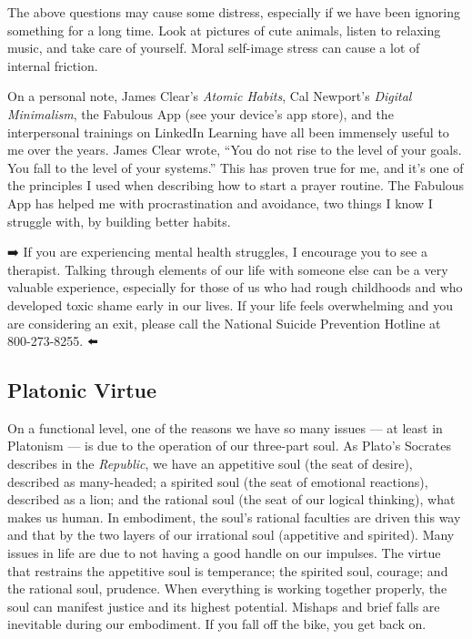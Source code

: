 \documentclass[
]{book}
\begin{document}
The above questions may cause some distress, especially if we have been ignoring something for a long time. Look at pictures of cute animals, listen to relaxing music, and take care of yourself. Moral self-image stress can cause a lot of internal friction.

On a personal note, James Clear's \emph{Atomic Habits}, Cal Newport's \emph{Digital Minimalism}, the Fabulous App (see your device's app store), and the interpersonal trainings on LinkedIn Learning have all been immensely useful to me over the years. James Clear wrote, ``You do not rise to the level of your goals. You fall to the level of your systems.'' This has proven true for me, and it's one of the principles I used when describing how to start a prayer routine. The Fabulous App has helped me with procrastination and avoidance, two things I know I struggle with, by building better habits.

➡️ If you are experiencing mental health struggles, I encourage you to see a therapist. Talking through elements of our life with someone else can be a very valuable experience, especially for those of us who had rough childhoods and who developed toxic shame early in our lives. If your life feels overwhelming and you are considering an exit, please call the National Suicide Prevention Hotline at 800-273-8255. ⬅️

\hypertarget{platonic-virtue}{%
\subsection{Platonic Virtue}\label{platonic-virtue}}

On a functional level, one of the reasons we have so many issues --- at least in Platonism --- is due to the operation of our three-part soul. As Plato's Socrates describes in the \emph{Republic}, we have an appetitive soul (the seat of desire), described as many-headed; a spirited soul (the seat of emotional reactions), described as a lion; and the rational soul (the seat of our logical thinking), what makes us human. In embodiment, the soul's rational faculties are driven this way and that by the two layers of our irrational soul (appetitive and spirited). Many issues in life are due to not having a good handle on our impulses. The virtue that restrains the appetitive soul is temperance; the spirited soul, courage; and the rational soul, prudence. When everything is working together properly, the soul can manifest justice and its highest potential. Mishaps and brief falls are inevitable during our embodiment. If you fall off the bike, you get back on.
\end{document}
